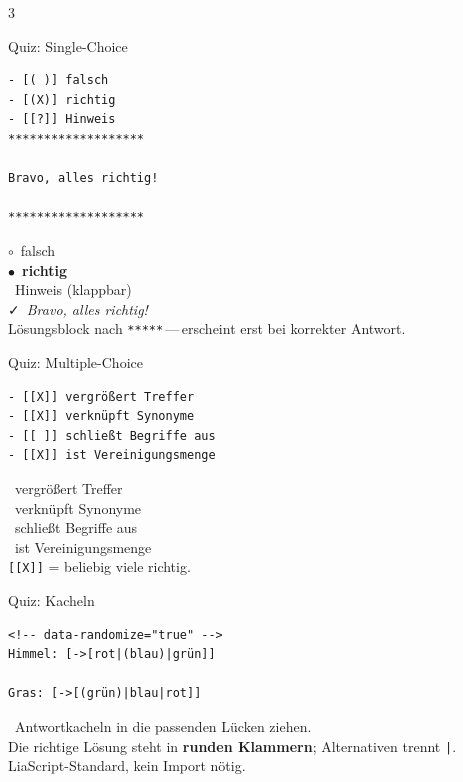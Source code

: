 \documentclass[a4paper,landscape,9pt]{extarticle}
\newcommand{\prevsm}[1]{{\footnotesize\color{muted} #1}}
\begin{document}
\begin{multicols}{3}
\begin{liacard}{Quiz: Single-Choice}
\begin{lstlisting}[language=lia]
- [( )] falsch
- [(X)] richtig
- [[?]] Hinweis
*******************

Bravo, alles richtig!

*******************
\end{lstlisting}
\tcblower
\prevsm{$\circ$~falsch\\
$\bullet$~\textbf{richtig}\\
\faQuestionCircle~Hinweis (klappbar)\\[3pt]
{\footnotesize\color{liagreen}\faCheck~\textit{Bravo, alles richtig!}}\\[2pt]
{\footnotesize Lösungsblock nach \texttt{*****}\,---\,erscheint erst bei korrekter Antwort.}}
\end{liacard}

\begin{liacard}{Quiz: Multiple-Choice}
\begin{lstlisting}[language=lia]
- [[X]] vergrößert Treffer
- [[X]] verknüpft Synonyme
- [[ ]] schließt Begriffe aus
- [[X]] ist Vereinigungsmenge
\end{lstlisting}
\tcblower
\prevsm{\faCheckSquare~vergrößert Treffer\\
\faCheckSquare~verknüpft Synonyme\\
\faSquare~schließt Begriffe aus\\
\faCheckSquare~ist Vereinigungsmenge\\[2pt]
{\footnotesize \texttt{[[X]]} = beliebig viele richtig.}}
\end{liacard}

\begin{liacard}{Quiz: Kacheln}
\begin{lstlisting}[language=lia]
<!-- data-randomize="true" -->
Himmel: [->[rot|(blau)|grün]]

Gras: [->[(grün)|blau|rot]]
\end{lstlisting}
\tcblower
\prevsm{\faTh~Antwortkacheln in die passenden Lücken ziehen.\\[2pt]
Die richtige Lösung steht in \textbf{runden Klammern}; Alternativen trennt \texttt{|}.\\[2pt]
{\footnotesize LiaScript-Standard, kein Import nötig.}}
\end{liacard}


\end{multicols}
\end{document}

